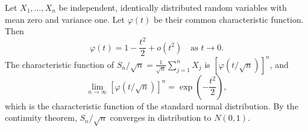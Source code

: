 Let $X_1, \ldots, X_n$ be independent, identically distributed random variables with mean zero and variance one. Let $\varphi(t)$ be their common characteristic function. Then
$$\varphi(t) = 1 - \frac{t^2}{2} + o(t^2) \quad \text{as } t \to 0.$$
The characteristic function of $S_n/\sqrt{n} = \frac{1}{\sqrt{n}} \sum_{j=1}^{n} X_j$ is $[\varphi(t/\sqrt{n})]^n$, and
$$\lim_{n \to \infty} [\varphi(t/\sqrt{n})]^n = \exp\left(-\frac{t^2}{2}\right),$$
which is the characteristic function of the standard normal distribution. By the continuity theorem, $S_n/\sqrt{n}$ converges in distribution to $N(0,1)$.
